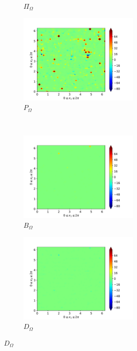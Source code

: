 \begin{figure}[H]
\begin{subfigure}{0.45\textwidth}
        \caption{$\Pi_{\Omega}$}
    \end{subfigure}
    \newline
    \begin{subfigure}{0.45\textwidth}
        \includegraphics[height=1.75in]{media/run-cds-65/P-enst-1420}
        \caption{$P_{\Omega}$}
    \end{subfigure}
    ~
    \begin{subfigure}{0.45\textwidth}
        \includegraphics[height=1.75in]{media/run-cds-65/B-enst-1420}
        \caption{$B_{\Omega}$}
    \end{subfigure}
    \newline
    \begin{subfigure}{0.45\textwidth}
        \includegraphics[height=1.75in]{media/run-cds-65/D-enst-1420}
        \caption{$D_{\Omega}$}
    \end{subfigure}
\end{figure}

\newpage

